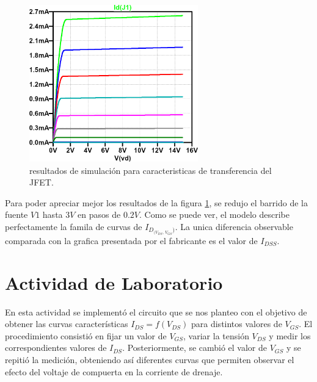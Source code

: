     \begin{figure}[!ht]
      \centering
      \includegraphics[width=0.65\textwidth]{images/transferencia-id_vds-vgs.png}
      \caption{resultados de simulación para caracteristicas de transferencia del JFET.}
      \label{fig:sim.transf}
    \end{figure}

    Para poder apreciar mejor los resultados de la figura \ref{fig:sim.transf}, se redujo el barrido de la fuente $V1$
    hasta $3V$ en pasos de $0.2V$. Como se puede ver, el modelo describe perfectamente la famila de curvas de
    $I_{D_{(V_{DS}, \, V_{GS}})}$. La unica diferencia observable comparada con la grafica presentada por el fabricante es el
    valor de $I_{DSS}$.

\section{Actividad de Laboratorio}

    En esta actividad se implementó el circuito que se nos planteo con el objetivo de obtener las curvas características $I_{DS} = f(V_{DS})$ para distintos valores de $V_{GS}$.  
    El procedimiento consistió en fijar un valor de $V_{GS}$, variar la tensión $V_{DS}$ y medir 
    los correspondientes valores de $I_{DS}$. Posteriormente, se cambió el valor de $V_{GS}$ y 
    se repitió la medición, obteniendo así diferentes curvas que permiten observar el efecto 
    del voltaje de compuerta en la corriente de drenaje.  
    

